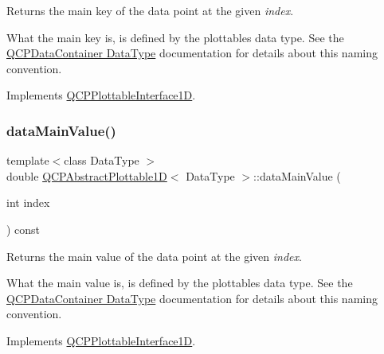 Returns the main key of the data point at the given {\itshape index}.

What the main key is, is defined by the plottable\textquotesingle{}s data type. See the \hyperlink{class_q_c_p_data_container_qcpdatacontainer-datatype}{Q\+C\+P\+Data\+Container Data\+Type} documentation for details about this naming convention. 

Implements \hyperlink{class_q_c_p_plottable_interface1_d_a2bd60daaac046945fead558cbd83cf73}{Q\+C\+P\+Plottable\+Interface1D}.

\mbox{\label{class_q_c_p_abstract_plottable1_d_a0f913bb0889ca7cb574657a078fc8cff}} 
\subsubsection{\texorpdfstring{data\+Main\+Value()}{dataMainValue()}}
{\footnotesize\ttfamily template$<$class Data\+Type $>$ \\
double \hyperlink{class_q_c_p_abstract_plottable1_d}{Q\+C\+P\+Abstract\+Plottable1D}$<$ Data\+Type $>$\+::data\+Main\+Value (\begin{DoxyParamCaption}\item[{int}]{index }\end{DoxyParamCaption}) const\hspace{0.3cm}{\ttfamily [virtual]}}





Returns the main value of the data point at the given {\itshape index}.

What the main value is, is defined by the plottable\textquotesingle{}s data type. See the \hyperlink{class_q_c_p_data_container_qcpdatacontainer-datatype}{Q\+C\+P\+Data\+Container Data\+Type} documentation for details about this naming convention. 

Implements \hyperlink{class_q_c_p_plottable_interface1_d_af6330919e8023277d08c958a6074fc76}{Q\+C\+P\+Plottable\+Interface1D}.

\mbox{\label{class_q_c_p_abstract_plottable1_d_a14cf167457cda163575e6eec2a0b178d}} 
